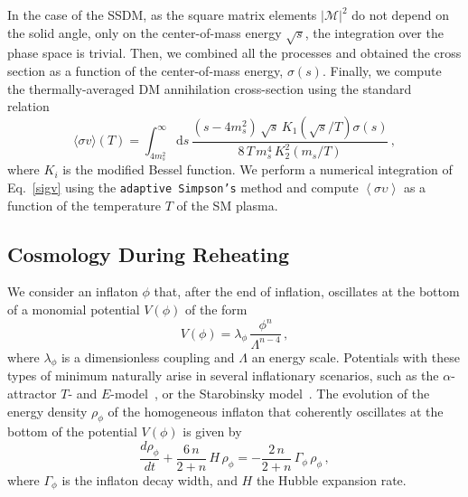 \documentclass[a4paper,11pt]{article}
\newcommand{\mdm}{m_s}
\newcommand{\rp}{\rho_\phi}
\newcommand{\Gp}{\Gamma_\phi}
\newcommand{\sv}{\langle\sigma v\rangle}
\begin{document}
In the case of the SSDM, as the square matrix elements $\left | \mathcal{M} \right |^2$ do not depend on the solid angle, only on the center-of-mass energy $\sqrt{s}$, the integration over the phase space is trivial.
Then, we combined all the processes and obtained the cross section as a function of the center-of-mass energy, $\sigma (s)$. Finally, we compute the thermally-averaged DM annihilation cross-section using the standard relation~\cite{Gondolo:1990dk}
\begin{equation} \label{sigv}
    \sv(T) = \int_{4\mdm^2}^{\infty} \mathrm{d}s\, \frac{(s-4\mdm^2) \, \sqrt{s} \, K_{1}\left ( \sqrt{s}/T \right ) \sigma(s)}{8 \,T\, \mdm^{4}\, K_2^2\left ( \mdm/T \right ) }\,,
\end{equation}
where $K_i$ is the modified Bessel function. We perform a numerical integration of Eq.~\eqref{sigv} using the \texttt{adaptive Simpson's} method and compute $\left \langle \sigma \upsilon \right \rangle$ as a function of the temperature $T$ of the SM plasma.

\subsection{Cosmology During Reheating} \label{sec:reheating}
We consider an inflaton $\phi$ that, after the end of inflation, oscillates at the bottom of a monomial potential $V(\phi)$ of the form
\begin{equation}
    V(\phi) = \lambda_\phi\, \frac{\phi^n}{\Lambda^{n - 4}}\,,
\end{equation}
where $\lambda_\phi$ is a dimensionless coupling and $\Lambda$ an energy scale.
Potentials with these types of minimum naturally arise in several inflationary scenarios, such as the $\alpha$-attractor $T$- and $E$-model~\cite{Kallosh:2013hoa, Kallosh:2013maa, Kallosh:2013yoa}, or the Starobinsky model~\cite{Starobinsky:1980te, Starobinsky:1981vz, Starobinsky:1983zz, Kofman:1985aw}.
The evolution of the energy density $\rp$ of the homogeneous inflaton that coherently oscillates at the bottom of the potential $V(\phi)$ is given by~\cite{Turner:1983he, Garcia:2020wiy, Bernal:2022wck}
\begin{equation} \label{eq:drhodt}
    \frac{d\rp}{dt} + \frac{6\, n}{2 + n}\, H\, \rp = - \frac{2\, n}{2 + n}\, \Gp\, \rp\,,
\end{equation}
where $\Gp$ is the inflaton decay width, and $H$ the Hubble expansion rate.
\end{document}
